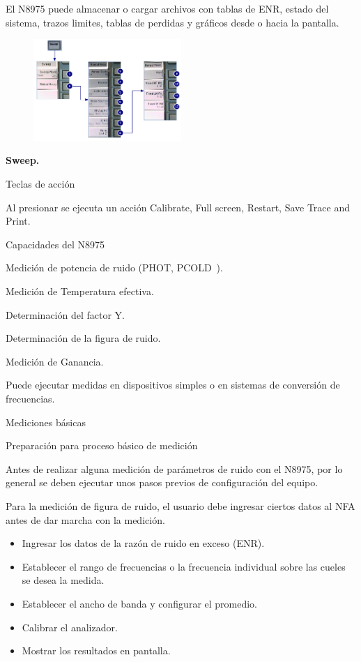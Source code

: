 {\begin{minipage}[t][11cm]{\textwidth}
		El N8975 puede almacenar o cargar archivos con tablas de ENR, estado del sistema, trazos limites, tablas de perdidas y gráficos desde o hacia la pantalla. 
	\end{minipage}


	\begin{minipage}[t][10cm]{\textwidth}
		\begin{figure}		
			\centering
			\includegraphics[width=0.5\textwidth]{./Imagenes/MenuSweepN8975A.pdf}	
		\end{figure}
		
		\textbf{Sweep.}		
	\end{minipage}
		
	Teclas de acción
	
	Al presionar se ejecuta un acción Calibrate, Full screen, Restart, Save Trace and Print.
	
	Capacidades del N8975
	
	Medición de potencia de ruido (PHOT, PCOLD~).
	
	Medición de Temperatura efectiva.
	
	Determinación del factor Y.
	
	Determinación de la figura de ruido.
	
	Medición de Ganancia.
	
	Puede ejecutar medidas en dispositivos simples o en sistemas de conversión de frecuencias.
	
	Mediciones básicas
	
	Preparación para proceso básico de medición
	
	Antes de realizar alguna medición de parámetros de ruido con el N8975, por lo general se deben ejecutar unos pasos
	previos de configuración del equipo.
	
	Para la medición de figura de ruido, el usuario debe ingresar ciertos datos al NFA antes de dar marcha con la medición.
	
	\begin{itemize}
		\item Ingresar los datos de la razón de ruido en exceso (ENR).
		\item Establecer el rango de frecuencias o la frecuencia individual sobre las cueles se desea la medida.
		\item Establecer el ancho de banda y configurar el promedio.
		\item Calibrar el analizador.
		\item Mostrar los resultados en pantalla.
	\end{itemize}

}
